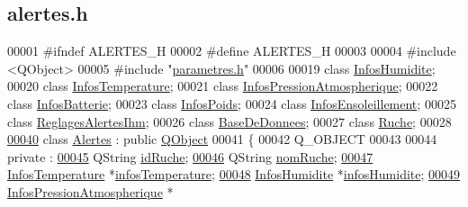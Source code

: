 \hypertarget{alertes_8h_source}{}\subsection{alertes.\+h}
\label{alertes_8h_source}

\begin{DoxyCode}
00001 \textcolor{preprocessor}{#ifndef ALERTES\_H}
00002 \textcolor{preprocessor}{#define ALERTES\_H}
00003 
00004 \textcolor{preprocessor}{#include <QObject>}
00005 \textcolor{preprocessor}{#include "\hyperlink{parametres_8h}{parametres.h}"}
00006 
00019 \textcolor{keyword}{class }\hyperlink{class_infos_humidite}{InfosHumidite};
00020 \textcolor{keyword}{class }\hyperlink{class_infos_temperature}{InfosTemperature};
00021 \textcolor{keyword}{class }\hyperlink{class_infos_pression_atmospherique}{InfosPressionAtmospherique};
00022 \textcolor{keyword}{class }\hyperlink{class_infos_batterie}{InfosBatterie};
00023 \textcolor{keyword}{class }\hyperlink{class_infos_poids}{InfosPoids};
00024 \textcolor{keyword}{class }\hyperlink{class_infos_ensoleillement}{InfosEnsoleillement};
00025 \textcolor{keyword}{class }\hyperlink{class_reglages_alertes_ihm}{ReglagesAlertesIhm};
00026 \textcolor{keyword}{class }\hyperlink{class_base_de_donnees}{BaseDeDonnees};
00027 \textcolor{keyword}{class }\hyperlink{class_ruche}{Ruche};
00028 
\hyperlink{class_alertes}{00040} \textcolor{keyword}{class }\hyperlink{class_alertes}{Alertes} : \textcolor{keyword}{public} \hyperlink{class_q_object}{QObject}
00041 \{
00042     Q\_OBJECT
00043 
00044     private :
\hyperlink{class_alertes_ae3f9d7aa34ab3c83a66c8484e2b89925}{00045}         QString \hyperlink{class_alertes_ae3f9d7aa34ab3c83a66c8484e2b89925}{idRuche};
\hyperlink{class_alertes_a212f2a7185bcc7b11f3e54200272bdcf}{00046}         QString \hyperlink{class_alertes_a212f2a7185bcc7b11f3e54200272bdcf}{nomRuche};
\hyperlink{class_alertes_ad02b203545812ad6408befecc94ee0ec}{00047}         \hyperlink{class_infos_temperature}{InfosTemperature} *\hyperlink{class_alertes_ad02b203545812ad6408befecc94ee0ec}{infosTemperature};
\hyperlink{class_alertes_a7b6d798ca0629b474120cd55eb8b510c}{00048}         \hyperlink{class_infos_humidite}{InfosHumidite} *\hyperlink{class_alertes_a7b6d798ca0629b474120cd55eb8b510c}{infosHumidite};
\hyperlink{class_alertes_af4bfb245d72bc2eb080df844aa50ac86}{00049}         \hyperlink{class_infos_pression_atmospherique}{InfosPressionAtmospherique} *

\end{DoxyCode}
